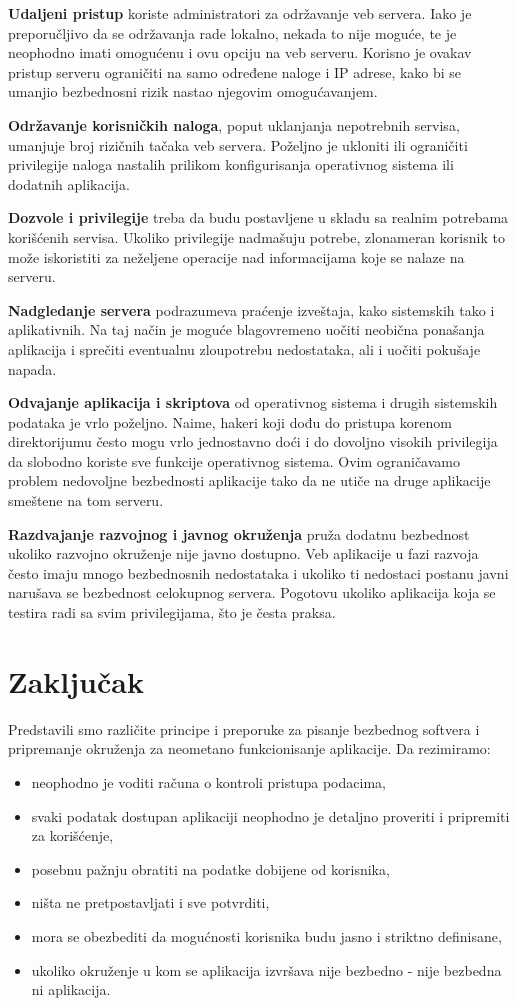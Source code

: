 \documentclass[a4paper]{article}
\begin{document}
\textbf{Udaljeni pristup} koriste administratori za održavanje veb servera. Iako je preporučljivo da se održavanja rade lokalno, nekada to nije moguće, te je neophodno imati omogućenu i ovu opciju na veb serveru. Korisno je ovakav pristup serveru ograničiti na samo određene naloge i IP adrese, kako bi se umanjio bezbednosni rizik nastao njegovim omogućavanjem.

\textbf{Održavanje korisničkih naloga}, poput uklanjanja nepotrebnih servisa, umanjuje broj rizičnih tačaka veb servera. Poželjno je ukloniti ili ograničiti privilegije naloga nastalih prilikom konfigurisanja operativnog sistema ili dodatnih aplikacija.

\textbf{Dozvole i privilegije} treba da budu postavljene u skladu sa realnim potrebama korišćenih servisa. Ukoliko privilegije nadmašuju potrebe, zlonameran korisnik to može iskoristiti za neželjene operacije nad informacijama koje se nalaze na serveru.

\textbf{Nadgledanje servera} podrazumeva praćenje izveštaja, kako sistemskih tako i aplikativnih. Na taj način je moguće blagovremeno uočiti neobična ponašanja aplikacija i sprečiti eventualnu zloupotrebu nedostataka, ali i uočiti pokušaje napada.

\textbf{Odvajanje aplikacija i skriptova} od operativnog sistema i drugih sistemskih podataka je vrlo poželjno. Naime, hakeri koji dođu do pristupa korenom direktorijumu često mogu vrlo jednostavno doći i do dovoljno visokih privilegija da slobodno koriste sve funkcije operativnog sistema. Ovim ograničavamo problem nedovoljne bezbednosti aplikacije tako da ne utiče na druge aplikacije smeštene na tom serveru.

\textbf{Razdvajanje razvojnog i javnog okruženja} pruža dodatnu bezbednost ukoliko razvojno okruženje nije javno dostupno. Veb aplikacije u fazi razvoja često imaju mnogo bezbednosnih nedostataka i ukoliko ti nedostaci postanu javni narušava se bezbednost celokupnog servera. Pogotovu ukoliko aplikacija koja se testira radi sa svim privilegijama, što je česta praksa.

\section{Zaključak} \label{zakljucak}

Predstavili smo različite principe i preporuke za pisanje bezbednog softvera i pripremanje okruženja za neometano funkcionisanje aplikacije. Da rezimiramo:
\begin{itemize}
	\item neophodno je voditi računa o kontroli pristupa podacima,
	\item svaki podatak dostupan aplikaciji neophodno je detaljno proveriti i pripremiti za korišćenje,
	\item posebnu pažnju obratiti na podatke dobijene od korisnika,
	\item ništa ne pretpostavljati i sve potvrditi,
	\item mora se obezbediti da mogućnosti korisnika budu jasno i striktno definisane,
	\item ukoliko okruženje u kom se aplikacija izvršava nije bezbedno - nije bezbedna ni aplikacija.
\end{itemize}
\end{document}
